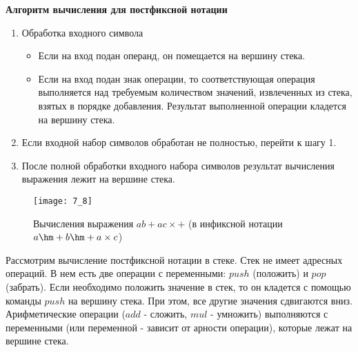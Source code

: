 \begin{center}
  \textbf{Алгоритм вычисления для постфиксной нотации}
\end{center}
\begin{enumerate}
  \item Обработка входного символа
  \begin{itemize}
    \item Если на вход подан операнд, он помещается на вершину стека.
    \item Если на вход подан знак операции, то соответствующая операция выполняется над требуемым количеством значений, извлеченных из стека, взятых в порядке добавления. Результат выполненной операции кладется на вершину стека.
  \end{itemize}
  \item Если входной набор символов обработан не полностью, перейти к шагу 1.
  \item После полной обработки входного набора символов результат вычисления выражения лежит на вершине стека.
\end{enumerate}
\begin{figure}[!h]
\centering
\texttt{[image: 7\_8]}
\caption{Вычисления выражения $ab+ac\times +$ (в инфиксной нотации $a\hm+b\hm+a\times c$)}
\end{figure}
Рассмотрим вычисление постфиксной нотации в стеке. Стек не имеет адресных операций. В нем есть две операции с переменными: $push$ (положить) и $pop$ (забрать). Если необходимо положить значение в стек, то он кладется с помощью команды $push$ на вершину стека. При этом, все другие значения сдвигаются вниз. Арифметические операции ($add$ - сложить, $mul$ - умножить) выполняются с переменными (или переменной - зависит от арности операции), которые лежат на вершине стека.